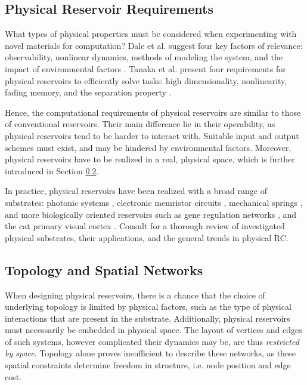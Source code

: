 \subsection{Physical Reservoir Requirements}
\label{ssec:physreq}

What types of physical properties must be considered when experimenting with
novel materials for computation? Dale et al. suggest four key factors of
relevance: observability, nonlinear dynamics, methods of modeling the system,
and the impact of environmental factors \cite{adamatzky_reservoir_2017}. Tanaka
et al. present four requirements for physical reservoirs to efficiently solve
tasks: high dimensionality, nonlinearity, fading memory, and the separation
property \cite{tanaka_recent_2018}.

Hence, the computational requirements of physical reservoirs are similar to
those of conventional reservoirs. Their main difference lie in their
operability, as physical reservoirs tend to be harder to interact with. Suitable
input and output schemes must exist, and may be hindered by environmental
factors. Moreover, physical reservoirs have to be realized in a real, physical
space, which is further introduced in Section
\ref{ssec:topology-and-spatial-networks}.

In practice, physical reservoirs have been realized with a broad range of
substrates: photonic systems \cite{vandoorne_experimental_2014}, electronic
memristor circuits \cite{kulkarni_memristor-based_2012}, mechanical springs
\cite{hauser_towards_2011}, and more biologically oriented reservoirs such as
gene regulation networks \cite{jones_is_2007}, and the cat primary visual cortex
\cite{scholkopf_temporal_2007}. Consult \cite{tanaka_recent_2018} for a thorough
review of investigated physical substrates, their applications, and the general
trends in physical RC.

\subsection{Topology and Spatial Networks}
\label{ssec:topology-and-spatial-networks}

When designing physical reservoirs, there is a chance that the choice of
underlying topology is limited by physical factors, such as the type of physical
interactions that are present in the substrate. Additionally, physical
reservoirs must necessarily be embedded in physical space. The layout of
vertices and edges of such systems, however complicated their dynamics may be,
are thus \textit{restricted by space}. Topology alone proves insufficient to
describe these networks, as these spatial constraints determine freedom in
structure, i.e. node position and edge cost.

